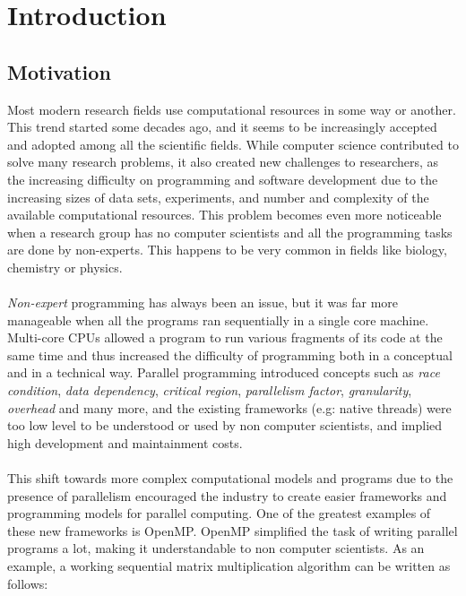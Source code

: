 \chapter{Introduction}
\label{sec:introduction}

\section{Motivation}
\label{subsec:intro_motivation}
Most modern research fields use computational resources in some way or another. This trend started some decades ago, and it seems to be increasingly accepted and adopted among all the scientific fields. While computer science contributed to solve many research problems, it also created new challenges to researchers, as the increasing difficulty on programming and software development due to the increasing sizes of data sets, experiments, and number and complexity of the available computational resources. This problem becomes even more noticeable when a research group has no computer scientists and all the programming tasks are done by non-experts. This happens to be very common in fields like biology, chemistry or physics.\\
\\
\textit{Non-expert} programming has always been an issue, but it was far more manageable when all the programs ran sequentially in a single core machine. Multi-core CPUs allowed a program to run various fragments of its code at the same time and thus increased the difficulty of programming both in a conceptual and in a technical way. Parallel programming introduced concepts such as \textit{race condition}, \textit{data dependency}, \textit{critical region}, \textit{parallelism factor}, \textit{granularity}, \textit{overhead} and many more, and the existing frameworks (e.g: native threads) were too low level to be understood or used by non computer scientists, and implied high development and maintainment costs.\\
\\
This shift towards more complex computational models and programs due to the presence of parallelism encouraged the industry to create easier frameworks and programming models for parallel computing. One of the greatest examples of these new frameworks is OpenMP\cite{openmp08}. OpenMP simplified the task of writing parallel programs a lot, making it understandable to non computer scientists. As an example, a working sequential matrix multiplication algorithm can be written as follows:
\inputminted{c}{snippets/matmul_openmp.cc}
